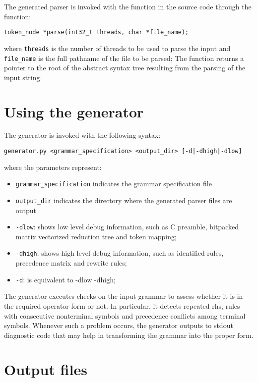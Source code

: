 \documentclass[a4paper,10pt]{article}
\begin{document}
The generated parser is invoked with the function in the source code through the function:

\begin{verbatim}
token_node *parse(int32_t threads, char *file_name);
\end{verbatim}

where \texttt{threads} is the number of threads to be used to parse the input and \texttt{file\_name} is the full pathname of the file to be parsed;
The function returns a pointer to the root of the abstract syntax tree resulting from the parsing of the input string. \textbf{}

\section{Using the generator}

The generator is invoked with the following syntax:\\
\begin{verbatim}
generator.py <grammar_specification> <output_dir> [-d|-dhigh|-dlow]
 \end{verbatim}

where the parameters represent:
\begin{itemize}
 \item  \texttt{grammar\_specification} indicates the grammar specification file
 \item  \texttt{output\_dir} indicates the directory where the generated parser files are output
 \item  \texttt{-dlow}: shows low level debug information, such as C preamble, bitpacked matrix vectorized reduction tree and token mapping;
 \item  \texttt{-dhigh}: shows high level debug information, such as identified rules, precedence matrix and rewrite rules;
 \item  \texttt{-d}: is equivalent to -dlow -dhigh;
\end{itemize}
The generator executes checks on the input grammar to assess whether it is in
the required operator form or not. In particular, it detects repeated rhs,
rules with consecutive nonterminal symbols and precedence conflicts among
terminal symbols. Whenever such a problem occurs, the generator outputs to
stdout diagnostic code that may help in transforming the grammar into the proper
form.

\section{Output files}
\end{document}
